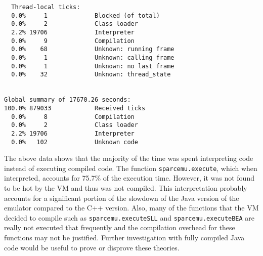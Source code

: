\begin{verbatim}
  Thread-local ticks:
  0.0%     1             Blocked (of total)
  0.0%     2             Class loader
  2.2% 19706             Interpreter
  0.0%     9             Compilation
  0.0%    68             Unknown: running frame
  0.0%     1             Unknown: calling frame
  0.0%     1             Unknown: no last frame
  0.0%    32             Unknown: thread_state


Global summary of 17670.26 seconds:
100.0% 879033            Received ticks
  0.0%     8             Compilation
  0.0%     2             Class loader
  2.2% 19706             Interpreter
  0.0%   102             Unknown code

\end{verbatim}

The above data shows that the majority of the time was spent interpreting
code instead of executing compiled code. The function
\texttt{sparcemu.execute}, which when interpreted, accounts for 75.7\% of
the execution time. However, it was not found to be hot by the VM and thus
was not compiled. This interpretation probably accounts for a significant
portion of the slowdown of the Java version of the emulator compared to
the C++ version. Also, many of the functions that the VM decided to
compile such as \texttt{sparcemu.executeSLL} and
\texttt{sparcemu.executeBEA} are really not executed that frequently and
the compilation overhead for these functions may not be justified. Further
investigation with fully compiled Java code would be useful to prove or
disprove these theories.







